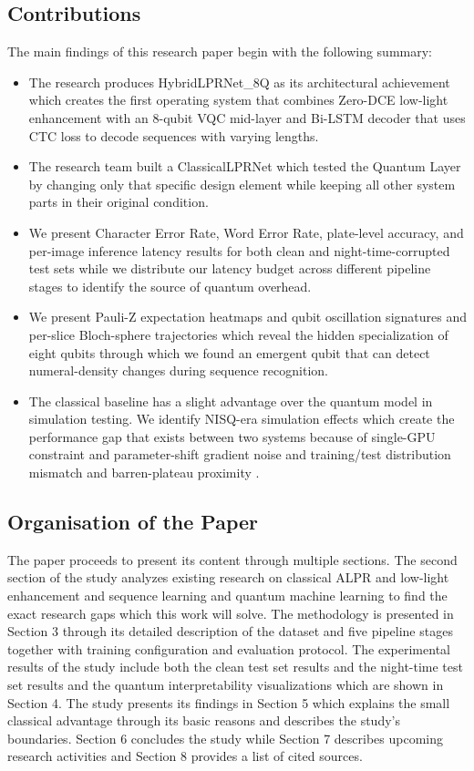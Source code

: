 \documentclass[preprint,12pt]{elsarticle}
\begin{document}
\subsection{Contributions}
The main findings of this research paper begin with the following summary:
\begin{itemize}
\item The research produces HybridLPRNet\_8Q as its architectural achievement which creates the first operating system that combines Zero-DCE low-light enhancement with an 8-qubit VQC mid-layer and Bi-LSTM decoder that uses CTC loss to decode sequences with varying lengths.
\item The research team built a ClassicalLPRNet which tested the Quantum Layer by changing only that specific design element while keeping all other system parts in their original condition.
\item We present Character Error Rate, Word Error Rate, plate-level accuracy, and per-image inference latency results for both clean and night-time-corrupted test sets while we distribute our latency budget across different pipeline stages to identify the source of quantum overhead.
\item We present Pauli-Z expectation heatmaps and qubit oscillation signatures and per-slice Bloch-sphere trajectories which reveal the hidden specialization of eight qubits through which we found an emergent qubit that can detect numeral-density changes during sequence recognition.
\item The classical baseline has a slight advantage over the quantum model in simulation testing. We identify NISQ-era simulation effects which create the performance gap that exists between two systems because of single-GPU constraint and parameter-shift gradient noise and training/test distribution mismatch and barren-plateau proximity \cite{b4}.
\end{itemize}

\subsection{Organisation of the Paper}
The paper proceeds to present its content through multiple sections. The second section of the study analyzes existing research on classical ALPR and low-light enhancement and sequence learning and quantum machine learning to find the exact research gaps which this work will solve. The methodology is presented in Section 3 through its detailed description of the dataset and five pipeline stages together with training configuration and evaluation protocol. The experimental results of the study include both the clean test set results and the night-time test set results and the quantum interpretability visualizations which are shown in Section 4. The study presents its findings in Section 5 which explains the small classical advantage through its basic reasons and describes the study's boundaries. Section 6 concludes the study while Section 7 describes upcoming research activities and Section 8 provides a list of cited sources.
\end{document}
